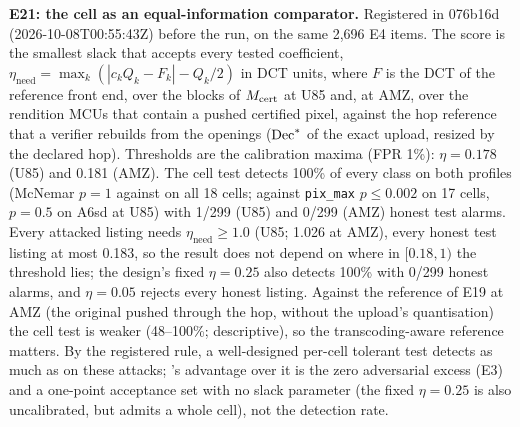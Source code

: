 \documentclass[10pt]{article}
\begin{document}
\textbf{E21: the \Eone{} cell as an equal-information comparator.} Registered in 076b16d (2026-10-08T00:55:43Z) before
the run, on the same 2,696 E4 items. The score is the smallest slack that accepts every tested coefficient,
$\eta_{\mathrm{need}}=\max_k(|c_kQ_k-F_k|-Q_k/2)$ in DCT units, where $F$ is the DCT of the reference front end, over
the blocks of $M_{\mathrm{cert}}$ at U85 and, at AMZ, over the rendition MCUs that contain a pushed certified pixel, against the
hop reference that a verifier rebuilds from the openings ($\mathrm{Dec}^{*}$ of the exact upload, resized by the declared hop).
Thresholds are the calibration maxima (FPR 1\%): $\eta=0.178$ (U85) and 0.181 (AMZ). The cell test detects 100\% of
every class on both profiles (McNemar $p=1$ against \sys{} on all 18 cells; against \texttt{pix\_max} $p\le0.002$ on
17 cells, $p=0.5$ on A6sd at U85) with 1/299 (U85) and 0/299 (AMZ) honest test alarms. Every attacked listing needs
$\eta_{\mathrm{need}}\ge1.0$ (U85; 1.026 at AMZ), every honest test listing at most 0.183, so the result does not
depend on where in $[0.18,1)$ the threshold lies; the design's fixed $\eta=0.25$ also detects 100\% with 0/299 honest
alarms, and $\eta=0.05$ rejects every honest listing. Against the reference of E19 at AMZ (the original pushed through
the hop, without the upload's quantisation) the cell test is weaker (48--100\%; descriptive), so the
transcoding-aware reference matters. By the registered rule, a well-designed per-cell tolerant test detects as much as
\sys{} on these attacks; \sys{}'s advantage over it is the zero adversarial excess (E3) and a one-point acceptance set with no
slack parameter (the fixed $\eta=0.25$ is also uncalibrated, but admits a whole cell), not the detection rate.
\end{document}
